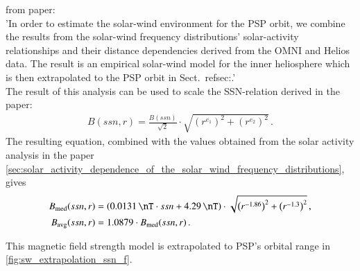 from paper:\\
'In order to estimate the solar-wind environment for the PSP orbit, we combine the results from the solar-wind frequency distributions’ solar-activity relationships and their distance dependencies derived from the OMNI and Helios data. The result is an empirical solar-wind model for the inner heliosphere which is then extrapolated to the PSP orbit in Sect.~ref{sec:}.'\\

The result of this analysis can be used to scale the SSN-relation derived in the paper:
\begin{align}
	B(ssn,r) = \frac{B(ssn)}{\sqrt{2}} \cdot \sqrt{\left(r^{e_1}\right)^2 + \left(r^{e_2}\right)^2}	\,.
\end{align}
The resulting equation, combined with the values obtained from the solar activity analysis in the paper \autoref{sec:solar_activity_dependence_of_the_solar_wind_frequency_distributions}, gives
\begin{align}
	B_\text{med}(ssn,r) &= \left(\SI{0.0131}{\nT} \cdot ssn + \SI{4.29}{\nT}\right) \cdot \sqrt{\left(r^{-1.86}\right)^2 + \left(r^{-1.3}\right)^2}	\,,\\
	B_\text{avg}(ssn,r) &= 1.0879 \cdot B_\text{med}(ssn,r)\,.
\end{align}

This magnetic field strength model is extrapolated to PSP's orbital range in \autoref{fig:sw_extrapolation_ssn_f}.\\
\begin{figure}[htb]
\end{figure}

